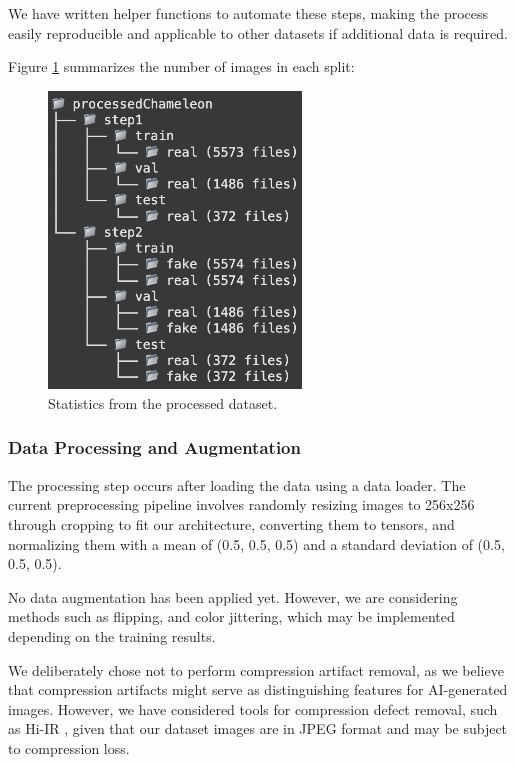 \documentclass{article} %
\begin{document}
We have written helper functions to automate these steps, making the process easily reproducible and applicable to other datasets if additional data is required.

Figure \ref{fig:cleaned_statistic} summarizes the number of images in each split:
\begin{figure}[h]
    \centering
    \includegraphics[width=0.6\textwidth]{figs/cleaned_statistic.png}
    \caption{Statistics from the processed dataset.}
    \label{fig:cleaned_statistic}
\end{figure}

\subsubsection{Data Processing and Augmentation}
The processing step occurs after loading the data using a data loader. The current preprocessing pipeline involves randomly resizing images to 256x256 through cropping to fit our architecture, converting them to tensors, and normalizing them with a mean of (0.5, 0.5, 0.5) and a standard deviation of (0.5, 0.5, 0.5). 

No data augmentation has been applied yet. However, we are considering methods such as flipping, and color jittering, which may be implemented depending on the training results.

We deliberately chose not to perform compression artifact removal, as we believe that compression artifacts might serve as distinguishing features for AI-generated images. However, we have considered tools for compression defect removal, such as Hi-IR \citep{li2024hierarchicalinformationflowgeneralized}, given that our dataset images are in JPEG format and may be subject to compression loss.
\end{document}
